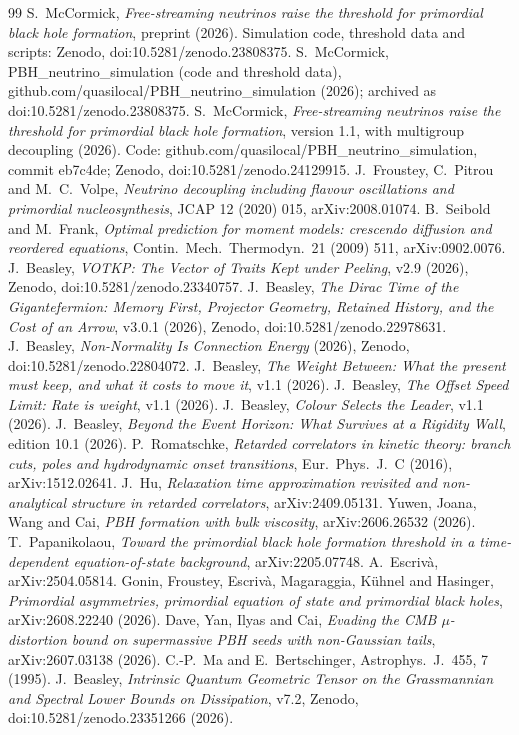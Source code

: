 \documentclass[11pt]{article}
\begin{document}
\begin{thebibliography}{99}
 S.~McCormick, \emph{Free-streaming neutrinos raise the threshold for primordial black hole formation}, preprint (2026). Simulation code, threshold data and scripts: Zenodo, doi:10.5281/zenodo.23808375.
 S.~McCormick, PBH\_neutrino\_simulation (code and threshold data), github.com/quasilocal/PBH\_neutrino\_simulation (2026); archived as doi:10.5281/zenodo.23808375.
 S.~McCormick, \emph{Free-streaming neutrinos raise the threshold for primordial black hole formation}, version 1.1, with multigroup decoupling (2026). Code: github.com/quasilocal/PBH\_neutrino\_simulation, commit eb7c4de; Zenodo, doi:10.5281/zenodo.24129915.
 J.~Froustey, C.~Pitrou and M.~C.~Volpe, \emph{Neutrino decoupling including flavour oscillations and primordial nucleosynthesis}, JCAP 12 (2020) 015, arXiv:2008.01074.
 B.~Seibold and M.~Frank, \emph{Optimal prediction for moment models: crescendo diffusion and reordered equations}, Contin.\ Mech.\ Thermodyn.\ 21 (2009) 511, arXiv:0902.0076.
 J.~Beasley, \emph{VOTKP: The Vector of Traits Kept under Peeling}, v2.9 (2026), Zenodo, doi:10.5281/zenodo.23340757.
 J.~Beasley, \emph{The Dirac Time of the Gigantefermion: Memory First, Projector Geometry, Retained History, and the Cost of an Arrow}, v3.0.1 (2026), Zenodo, doi:10.5281/zenodo.22978631.
 J.~Beasley, \emph{Non-Normality Is Connection Energy} (2026), Zenodo, doi:10.5281/zenodo.22804072.
 J.~Beasley, \emph{The Weight Between: What the present must keep, and what it costs to move it}, v1.1 (2026).
 J.~Beasley, \emph{The Offset Speed Limit: Rate is weight}, v1.1 (2026).
 J.~Beasley, \emph{Colour Selects the Leader}, v1.1 (2026).
 J.~Beasley, \emph{Beyond the Event Horizon: What Survives at a Rigidity Wall}, edition 10.1 (2026).
 P.~Romatschke, \emph{Retarded correlators in kinetic theory: branch cuts, poles and hydrodynamic onset transitions}, Eur.\ Phys.\ J.\ C (2016), arXiv:1512.02641.
 J.~Hu, \emph{Relaxation time approximation revisited and non-analytical structure in retarded correlators}, arXiv:2409.05131.
 Yuwen, Joana, Wang and Cai, \emph{PBH formation with bulk viscosity}, arXiv:2606.26532 (2026).
 T.~Papanikolaou, \emph{Toward the primordial black hole formation threshold in a time-dependent equation-of-state background}, arXiv:2205.07748.
 A.~Escriv\`a, arXiv:2504.05814.
 Gonin, Froustey, Escriv\`a, Magaraggia, K\"uhnel and Hasinger, \emph{Primordial asymmetries, primordial equation of state and primordial black holes}, arXiv:2608.22240 (2026).
 Dave, Yan, Ilyas and Cai, \emph{Evading the CMB $\mu$-distortion bound on supermassive PBH seeds with non-Gaussian tails}, arXiv:2607.03138 (2026).
 C.-P.~Ma and E.~Bertschinger, Astrophys.\ J.\ 455, 7 (1995).
 J.~Beasley, \emph{Intrinsic Quantum Geometric Tensor on the Grassmannian and Spectral Lower Bounds on Dissipation}, v7.2, Zenodo, doi:10.5281/zenodo.23351266 (2026).
\end{thebibliography}
\end{document}
